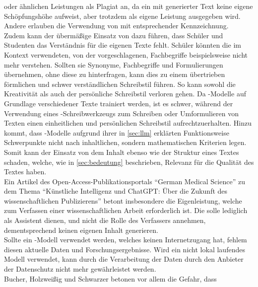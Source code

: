 \documentclass[../main.tex]{subfiles}
\begin{document}
oder ähnlichen Leistungen als Plagiat an, da ein mit  generierter Text keine eigene Schöpfungshöhe aufweist, aber trotzdem als eigene Leistung ausgegeben wird. Andere erlauben die Verwendung von 
 mit entsprechender Kennzeichnung.\cite{Plagiate}\\
Zudem kann der übermäßige Einsatz von  dazu führen, dass Schüler und Studenten das Verständnis für die eigenen Texte fehlt. Schüler könnten die im 
Kontext verwendeten, von der  vorgeschlagenen, Fachbegriffe beispielsweise nicht mehr verstehen. Sollten sie Synonyme, Fachbegriffe und Formulierungen 
übernehmen, ohne diese zu hinterfragen, kann dies zu einem übertrieben förmlichen und schwer verständlichen Schreibstil führen\cite{teachers}. 
So kann sowohl die Kreativität als auch der persönliche Schreibstil verloren gehen. Da -Modelle auf Grundlage verschiedener Texte trainiert werden, ist es
schwer, während der Verwendung eines -Schreibwerkzeugs zum Schreiben oder Umformulieren von Texten einen einheitlichen und persönlichen Schreibstil aufrechtzuerhalten\cite{creativeWriting}. Hinzu kommt,
dass -Modelle aufgrund ihrer in \autoref{sec:llm} erklärten Funktionsweise Schwerpunkte nicht nach inhaltlichen, sondern mathematischen Kriterien legen\cite{berensBolk}. Somit kann der 
Einsatz von  dem Inhalt ebenso wie der Struktur eines Textes schaden, welche, wie in \autoref{sec:bedeutung} beschrieben, Relevanz für die Qualität des Textes haben.\\
Ein Artikel des Open-Access-Publikationsportals "`German Medical Science"' zu dem Thema "`Künstliche Intelligenz und ChatGPT: Über die Zukunft des wissenschaftlichen Publizierens"'
betont insbesondere die Eigenleistung, welche zum Verfassen einer wissenschaftlichen Arbeit erforderlich ist. Die  solle lediglich als Assistent dienen, und
nicht die Rolle des Verfassers annehmen, dementsprechend keinen eigenen Inhalt generieren.\cite{ZukunftWissenschaftlichesPublizieren} \\ Sollte ein -Modell verwendet werden, welches keinen Internetzugang hat,
fehlem diesen aktuelle Daten und Forschungsergebnisse. Wird ein nicht lokal laufendes Modell verwendet, kann durch die Verarbeitung der Daten durch den  Anbieter
der Datenschutz nicht mehr gewährleistet werden.\cite{ZukunftWissenschaftlichesPublizieren} \\ Bucher, Holzweißig und Schwarzer betonen vor allem die Gefahr, dass 
\end{document}
